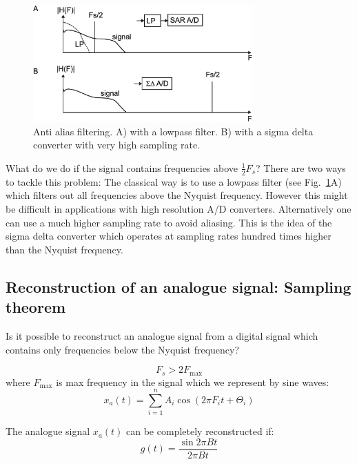 \documentclass[12pt,a4paper]{article}
\begin{document}
\begin{figure}[!hbt]
\begin{center}
\mbox{\includegraphics[width=0.75\textwidth]{anti_alias}}
\end{center}
\caption{Anti alias filtering. A) with a lowpass filter. B)
with a sigma delta converter with very high sampling rate.
\label{anti_alias}}
\end{figure}

What do we do if the signal contains frequencies above 
$\frac{1}{2} F_s$? There are two ways to tackle this problem:
The classical way is
to use a lowpass filter (see Fig.~\ref{anti_alias}A) which filters
out all frequencies above the Nyquist frequency. However this
might be difficult in applications with high resolution A/D converters.
Alternatively one can use a much higher sampling rate to avoid
aliasing. This is the idea of the sigma delta converter
which operates at sampling rates hundred times higher than the
Nyquist frequency.


\subsection{Reconstruction of an analogue signal: Sampling theorem}
Is it possible to reconstruct an analogue signal from a digital signal
which contains only frequencies below the Nyquist frequency?

\begin{equation}
F_s > 2 F_{\mbox{max}}
\end{equation}
where $F_{\mbox{max}}$ is max frequency in the signal which we
represent by sine waves:
\begin{equation}
x_{a}(t) = \sum_{i=1}^{n} A_i \cos (2 \pi F_{i}t  + \Theta_{i})
\end{equation}

The analogue signal $x_{a}(t)$ can be completely reconstructed if:
\begin{equation}
g(t) = \frac{\sin 2\pi Bt}{2 \pi Bt}
\end{equation}
\end{document}
